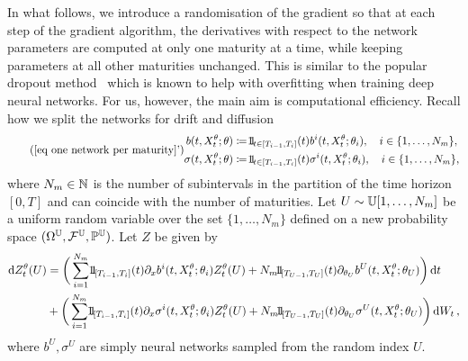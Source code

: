 In what follows, we introduce a randomisation of the gradient so that at each step of the gradient algorithm, the derivatives with respect to the network parameters are computed at only one maturity at a time, while keeping parameters at all other maturities unchanged. This is similar to the popular dropout method~\cite{Srivastava2014Dropout:Overfitting} which is known to help with overfitting when training deep neural networks. For us, however, the main aim is computational efficiency.
Recall how we split the networks for drift and diffusion %
\begin{equation} 
\tag{\ref{eq one network per maturity}'}
\begin{split}
b(t,X_t^{\theta};\theta) & \defEqual  \ind_{t\in[T_{i-1},T_i]}(t)b^i(t,X_t^{\theta};\theta_i), \quad i\in\{1,\ldots,N_{m}\},	\\
\sigma(t,X_t^{\theta};\theta) & \defEqual  \ind_{t\in[T_{i-1},T_i]}(t)\sigma^i(t,X_t^{\theta};\theta_i), \quad i\in\{1,\ldots,N_{m}\},	
\end{split}
\end{equation}
where $N_m\in\mathbb{N}$ is the number of subintervals in the partition of the time horizon $[0, T]$ and can coincide with the number of maturities. Let $U\sim \mathbb{U}[1,\ldots,N_{m}]$ be a uniform random variable over the set $\{1,\ldots, N_{m}\}$ defined on a new probability space $( \Omega^{\mathbb{U}}, \mathcal{F}^{\mathbb{U}},\mathbb{P}^{\mathbb{U}})$. 
Let $Z$ be given by 
\begin{equation}
\label{eq rand train Z}
\begin{split}
\D Z_t^{\theta}(U) &= \bigg(\sum_{i=1}^{N_{m}} \ind_{[T_{i-1},T_i]}(t) \partial_x b^i(t,X_t^{\theta};\theta_i) Z_t^{\theta}(U)   +  N_m \ind_{[T_{U-1},T_U]}(t) \partial_{\theta_{U}} b^{U}(t,X_t^{\theta};\theta_{U}) \bigg)\, \D t \\  
& + \bigg(\sum_{i=1}^{N_{m}} \ind_{[T_{i-1},T_i]}(t)\partial_x \sigma^i(t,X_t^{\theta};\theta_i) Z_t^{\theta}(U)   +  N_m \ind_{[T_{U-1},T_U]}(t) \partial_{\theta_{U}} \sigma^{U}(t,X_t^{\theta};\theta_{U}) \bigg)\, \D W_t \,, 
\end{split}
\end{equation}
where $b^U,\sigma^U$ are simply neural networks sampled from the random index $U$.


